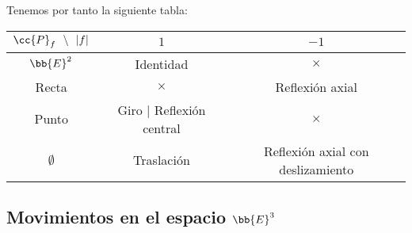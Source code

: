 Tenemos por tanto la siguiente tabla:
\begin{table}[H]
    \centering
    \begin{tabular}{c||c|c}
        $\cc{P}_f~~\backslash~~|f|$ & $1$ & $-1$  \\ \hline \hline
        $\bb{E}^2$ & Identidad & $\times$ \\
        Recta & $\times$ & Reflexión axial \\
        Punto & Giro $\mid$ Reflexión central & $\times$ \\
        $\emptyset$ & Traslación & Reflexión axial con deslizamiento
    \end{tabular}
\end{table}


\subsection{Movimientos en el espacio $\bb{E}^3$}
